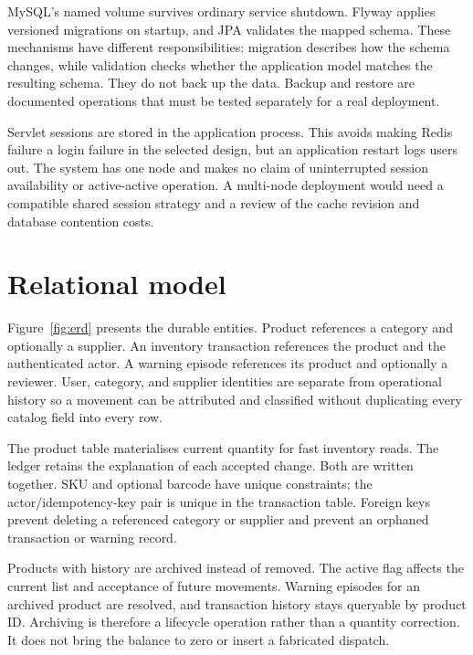 
MySQL's named volume survives ordinary service shutdown. Flyway applies versioned migrations on startup, and JPA validates the mapped schema. These mechanisms have different responsibilities: migration describes how the schema changes, while validation checks whether the application model matches the resulting schema. They do not back up the data. Backup and restore are documented operations that must be tested separately for a real deployment.

Servlet sessions are stored in the application process. This avoids making Redis failure a login failure in the selected design, but an application restart logs users out. The system has one node and makes no claim of uninterrupted session availability or active-active operation. A multi-node deployment would need a compatible shared session strategy and a review of the cache revision and database contention costs.

\section{Relational model}
Figure~\ref{fig:erd} presents the durable entities. Product references a category and optionally a supplier. An inventory transaction references the product and the authenticated actor. A warning episode references its product and optionally a reviewer. User, category, and supplier identities are separate from operational history so a movement can be attributed and classified without duplicating every catalog field into every row.


The product table materialises current quantity for fast inventory reads. The ledger retains the explanation of each accepted change. Both are written together. SKU and optional barcode have unique constraints; the actor/idempotency-key pair is unique in the transaction table. Foreign keys prevent deleting a referenced category or supplier and prevent an orphaned transaction or warning record.

Products with history are archived instead of removed. The active flag affects the current list and acceptance of future movements. Warning episodes for an archived product are resolved, and transaction history stays queryable by product ID. Archiving is therefore a lifecycle operation rather than a quantity correction. It does not bring the balance to zero or insert a fabricated dispatch.

